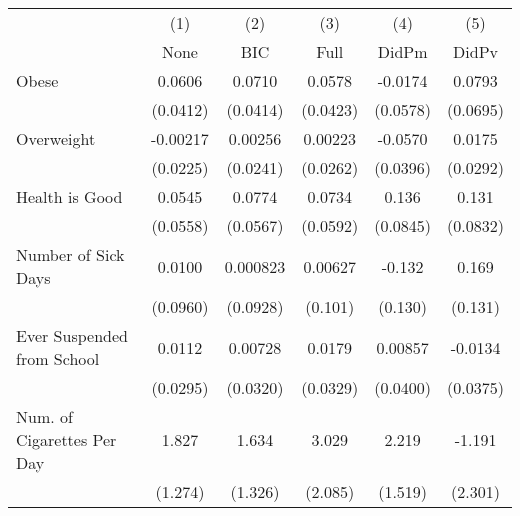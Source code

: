 {
\def\sym#1{\ifmmode^{#1}\else\(^{#1}\)\fi}
\begin{tabular}{l*{5}{c}}
\toprule
            &\multicolumn{1}{c}{(1)}&\multicolumn{1}{c}{(2)}&\multicolumn{1}{c}{(3)}&\multicolumn{1}{c}{(4)}&\multicolumn{1}{c}{(5)}\\
            &\multicolumn{1}{c}{None}&\multicolumn{1}{c}{BIC}&\multicolumn{1}{c}{Full}&\multicolumn{1}{c}{DidPm}&\multicolumn{1}{c}{DidPv}\\
\midrule
Obese       &      0.0606         &      0.0710         &      0.0578         &     -0.0174         &      0.0793         \\
            &    (0.0412)         &    (0.0414)         &    (0.0423)         &    (0.0578)         &    (0.0695)         \\
\addlinespace
Overweight  &    -0.00217         &     0.00256         &     0.00223         &     -0.0570         &      0.0175         \\
            &    (0.0225)         &    (0.0241)         &    (0.0262)         &    (0.0396)         &    (0.0292)         \\
\addlinespace
Health is Good&      0.0545         &      0.0774         &      0.0734         &       0.136         &       0.131         \\
            &    (0.0558)         &    (0.0567)         &    (0.0592)         &    (0.0845)         &    (0.0832)         \\
\addlinespace
Number of Sick Days&      0.0100         &    0.000823         &     0.00627         &      -0.132         &       0.169         \\
            &    (0.0960)         &    (0.0928)         &     (0.101)         &     (0.130)         &     (0.131)         \\
\addlinespace
Ever Suspended from School&      0.0112         &     0.00728         &      0.0179         &     0.00857         &     -0.0134         \\
            &    (0.0295)         &    (0.0320)         &    (0.0329)         &    (0.0400)         &    (0.0375)         \\
\addlinespace
Num. of Cigarettes Per Day&       1.827         &       1.634         &       3.029         &       2.219         &      -1.191         \\
            &     (1.274)         &     (1.326)         &     (2.085)         &     (1.519)         &     (2.301)         \\
\bottomrule
\end{tabular}
}
